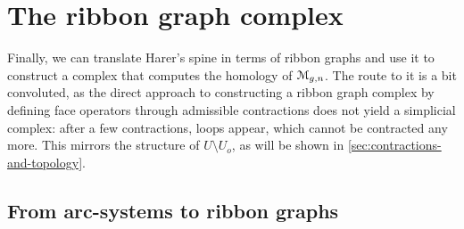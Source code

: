 \section{The ribbon graph complex}
\label{sec:ribbon-graph-complex}

Finally, we can translate Harer's spine in terms of ribbon graphs and
use it to construct a complex that computes the homology of
$\mathcal{M}_{g,n}$.  The route to it is a bit convoluted, as the direct
approach to constructing a ribbon graph complex by defining face
operators through admissible contractions does not yield a simplicial
complex: after a few contractions, loops appear, which cannot be
contracted any more.  This mirrors the structure of $U \setminus U_o$, as will
be shown in \ref{sec:contractions-and-topology}.


\subsection{From arc-systems to ribbon graphs}
\label{sec:arcs-to-rg}

